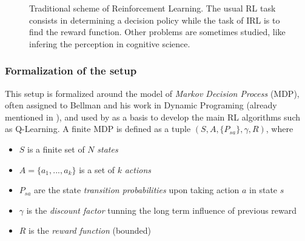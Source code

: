 \documentclass{article}
\begin{document}
\begin{figure}
\begin{center}
\end{center}
\caption{Traditional scheme of Reinforcement Learning. The usual RL task consists in determining a decision policy while the task of IRL is to find the reward function. Other problems are sometimes studied, like infering the perception in cognitive science. \label{fig:rl}}
\end{figure}

\subsubsection{Formalization of the setup}

This setup is formalized around the model of \emph{Markov Decision Process} (MDP), often assigned to Bellman and his work in Dynamic Programing (already mentioned in \cite{Bellman57}), and used by \cite{Watkins89} as a basis to develop the main RL algorithms such as Q-Learning. A finite MDP is defined as a tuple $(S,A,\{P_{sa}\},\gamma,R)$, where

\begin{itemize}
    \item $S$ is a finite set of $N$ \emph{states}
    \item $A=\{a_1,...,a_k\}$ is a set of $k$ \emph{actions}
    \item $P_{sa}$ are the state \emph{transition probabilities} upon taking action $a$ in state $s$
    \item $\gamma$ is the \emph{discount factor} tunning the long term influence of previous reward
    \item $R$ is the \emph{reward function} (bounded)
\end{itemize}
\end{document}
